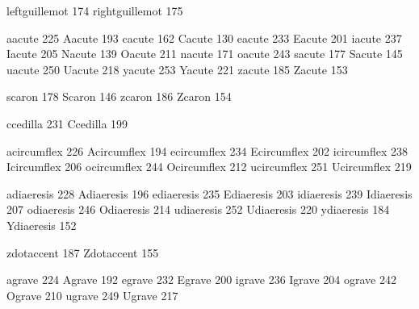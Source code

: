  leftguillemot    174
 rightguillemot   175

 aacute           225
 Aacute           193
 cacute           162
 Cacute           130
 eacute           233
 Eacute           201
 iacute           237
 Iacute           205
 Nacute           139
 Oacute           211
 nacute           171
 oacute           243
 sacute           177
 Sacute           145
 uacute           250
 Uacute           218
 yacute           253
 Yacute           221
 zacute           185
 Zacute           153

 scaron           178
 Scaron           146
 zcaron           186
 Zcaron           154

 ccedilla         231
 Ccedilla         199

 acircumflex      226
 Acircumflex      194
 ecircumflex      234
 Ecircumflex      202
 icircumflex      238
 Icircumflex      206
 ocircumflex      244
 Ocircumflex      212
 ucircumflex      251
 Ucircumflex      219

 adiaeresis       228
 Adiaeresis       196
 ediaeresis       235
 Ediaeresis       203
 idiaeresis       239
 Idiaeresis       207
 odiaeresis       246
 Odiaeresis       214
 udiaeresis       252
 Udiaeresis       220
 ydiaeresis       184
 Ydiaeresis       152

 zdotaccent       187
 Zdotaccent       155

 agrave           224
 Agrave           192
 egrave           232
 Egrave           200
 igrave           236
 Igrave           204
 ograve           242
 Ograve           210
 ugrave           249
 Ugrave           217

